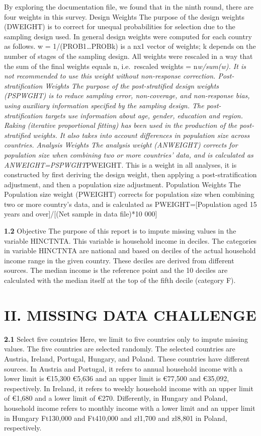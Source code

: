 \documentclass[
]{article}
\begin{document}
By exploring the documentation file, we found that in the ninth round,
there are four weights in this survey. Design Weights The purpose of the
design weights (DWEIGHT) is to correct for unequal probabilities for
selection due to the sampling design used. In general design weights
were computed for each country as follows. w =
1/(PROB1\emph{\ldots{}}PROBk) is a nx1 vector of weights; k depends on
the number of stages of the sampling design. All weights were rescaled
in a way that the sum of the final weights equals n, i.e.~rescaled
weights = n\emph{w/sum(w). It is not recommended to use this weight
without non-response correction. Post-stratification Weights The purpose
of the post-stratified design weights (PSPWGHT) is to reduce sampling
error, non-coverage, and non-response bias, using auxiliary information
specified by the sampling design. The post-stratification targets use
information about age, gender, education and region. Raking (iterative
proportional fitting) has been used in the production of the
post-stratified weights. It also takes into account differences in
population size across countries. Analysis Weights The analysis weight
(ANWEIGHT) corrects for population size when combining two or more
countries' data, and is calculated as ANWEIGHT=PSPWGHT}PWEIGHT. This is
a weight in all analyses, it is constructed by first deriving the design
weight, then applying a post-stratification adjustment, and then a
population size adjustment. Population Weights The Population size
weight (PWEIGHT) corrects for population size when combining two or more
country's data, and is calculated as PWEIGHT={[}Population aged 15 years
and over{]}/{[}(Net sample in data file)*10 000{]}

\textbf{1.2} Objective The purpose of this report is to impute missing
values in the variable HINCTNTA. This variable is household income in
deciles. The categories in variable HINCTNTA are national and based on
deciles of the actual household income range in the given country. These
deciles are derived from different sources. The median income is the
reference point and the 10 deciles are calculated with the median itself
at the top of the fifth decile (category F).

\hypertarget{ii.-missing-data-challenge}{%
\section{II. MISSING DATA CHALLENGE}\label{ii.-missing-data-challenge}}

\textbf{2.1} Select five countries Here, we limit to five countries only
to impute missing values. The five countries are selected randomly. The
selected countries are Austria, Ireland, Portugal, Hungary, and Poland.
These countries have different sources. In Austria and Portugal, it
refers to annual household income with a lower limit is €15,300 €5,636
and an upper limit is €77,500 and €35,092, respectively. In Ireland, it
refers to weekly household income with an upper limit of €1,680 and a
lower limit of €270. Differently, in Hungary and Poland, household
income refers to monthly income with a lower limit and an upper limit in
Hungary Ft130,000 and Ft410,000 and zł1,700 and zł8,801 in Poland,
respectively.
\end{document}
